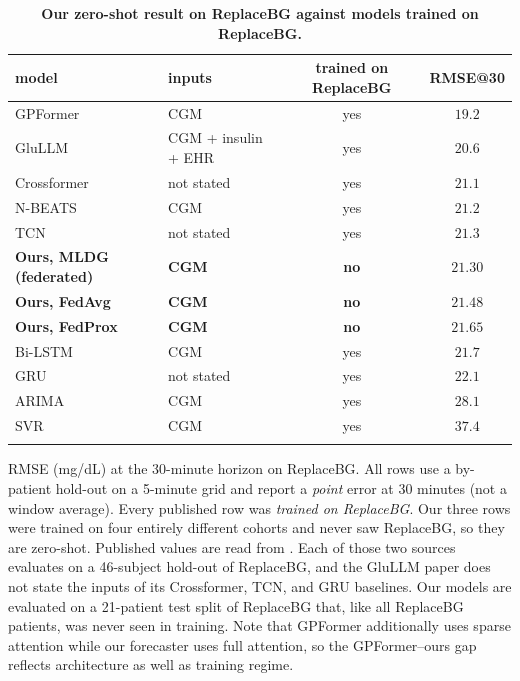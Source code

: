 \documentclass[10pt,letterpaper]{article}
\newlength\savedwidth
\newcommand\thickhline{\noalign{\global\savedwidth\arrayrulewidth\global\arrayrulewidth 2pt}%
\hline
\noalign{\global\arrayrulewidth\savedwidth}}
\begin{document}
\begin{table}[!ht]
\centering
\captionsetup{justification=centering,singlelinecheck=on}
\caption{\bf Our zero-shot result on ReplaceBG against models trained on ReplaceBG.}
\label{tab:oodprior}
\begin{tabular}{llcc}
\thickhline
model & inputs & trained on ReplaceBG & RMSE@30 \\
\hline
GPFormer \cite{zhu2024gpformer}    & CGM                & yes & $19.2$ \\
GluLLM \cite{zhu2026glullm}        & CGM + insulin + EHR & yes & $20.6$ \\
Crossformer \cite{zhu2026glullm}   & not stated         & yes & $21.1$ \\
N-BEATS \cite{zhu2024gpformer}     & CGM                & yes & $21.2$ \\
TCN \cite{zhu2026glullm}           & not stated         & yes & $21.3$ \\
\textbf{Ours, MLDG (federated)}   & \textbf{CGM}       & \textbf{no} & $\mathbf{21.30}$ \\
\textbf{Ours, FedAvg}             & \textbf{CGM}       & \textbf{no} & $\mathbf{21.48}$ \\
\textbf{Ours, FedProx}            & \textbf{CGM}       & \textbf{no} & $\mathbf{21.65}$ \\
Bi-LSTM \cite{zhu2024gpformer}     & CGM                & yes & $21.7$ \\
GRU \cite{zhu2026glullm}           & not stated         & yes & $22.1$ \\
ARIMA \cite{zhu2024gpformer}       & CGM                & yes & $28.1$ \\
SVR \cite{zhu2024gpformer}         & CGM                & yes & $37.4$ \\
\thickhline
\end{tabular}
\begin{center}
{\small RMSE (mg/dL) at the 30-minute horizon on ReplaceBG. All rows use a
by-patient hold-out on a 5-minute grid and report a \emph{point} error at 30
minutes (not a window average). Every published row was \emph{trained on
ReplaceBG}. Our three rows were trained on four entirely different cohorts and
never saw ReplaceBG, so they are zero-shot. Published values are read from
\cite{zhu2024gpformer,zhu2026glullm}. Each of those two sources evaluates on a
46-subject hold-out of ReplaceBG, and the GluLLM paper does not state the inputs
of its Crossformer, TCN, and GRU baselines. Our models are evaluated on a 21-patient
test split of ReplaceBG that, like all ReplaceBG patients, was never seen in
training. Note that GPFormer additionally uses sparse attention while our
forecaster uses full attention, so the GPFormer--ours gap reflects architecture as
well as training regime.}
\end{center}
\end{table}
\end{document}
